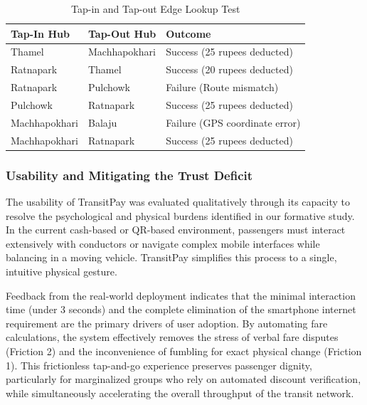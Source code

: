 \documentclass[manuscript,review,anonymous]{acmart}
\begin{document}
\begin{table}[t]
  \centering
  \caption{Tap-in and Tap-out Edge Lookup Test}
  \label{tab:tapped_in_and_tapped_out}
  \begin{tabularx}{\columnwidth}{
    >{\RaggedRight\arraybackslash}X
    >{\RaggedRight\arraybackslash}X
    >{\RaggedRight\arraybackslash}X
  }
  \toprule
  \textbf{Tap-In Hub} & \textbf{Tap-Out Hub} & \textbf{Outcome} \\
  \midrule
  Thamel & Machhapokhari & Success (25 rupees deducted) \\
  Ratnapark & Thamel & Success (20 rupees deducted) \\
  Ratnapark & Pulchowk & Failure (Route mismatch) \\
  Pulchowk & Ratnapark & Success (25 rupees deducted) \\
  Machhapokhari & Balaju & Failure (GPS coordinate error) \\
  Machhapokhari & Ratnapark & Success (25 rupees deducted) \\
  \bottomrule
  \end{tabularx}
  \end{table}

\subsubsection{Usability and Mitigating the Trust Deficit}

The usability of TransitPay was evaluated qualitatively through its capacity to resolve the psychological and physical burdens identified in our formative study. In the current cash-based or QR-based environment, passengers must interact extensively with conductors or navigate complex mobile interfaces while balancing in a moving vehicle. TransitPay simplifies this process to a single, intuitive physical gesture.

Feedback from the real-world deployment indicates that the minimal interaction time (under 3 seconds) and the complete elimination of the smartphone internet requirement are the primary drivers of user adoption. By automating fare calculations, the system effectively removes the stress of verbal fare disputes (Friction 2) and the inconvenience of fumbling for exact physical change (Friction 1). This frictionless tap-and-go experience preserves passenger dignity, particularly for marginalized groups who rely on automated discount verification, while simultaneously accelerating the overall throughput of the transit network.
\end{document}
